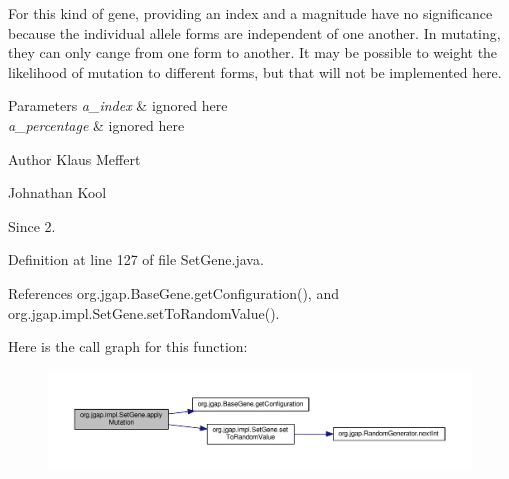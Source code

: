 For this kind of gene, providing an index and a magnitude have no significance because the individual allele forms are independent of one another. In mutating, they can only cange from one form to another. It may be possible to weight the likelihood of mutation to different forms, but that will not be implemented here.


\begin{DoxyParams}{Parameters}
{\em a\-\_\-index} & ignored here \\
\hline
{\em a\-\_\-percentage} & ignored here\\
\hline
\end{DoxyParams}
\begin{DoxyAuthor}{Author}
Klaus Meffert 

Johnathan Kool 
\end{DoxyAuthor}
\begin{DoxySince}{Since}
2. 
\end{DoxySince}


Definition at line 127 of file Set\-Gene.\-java.



References org.\-jgap.\-Base\-Gene.\-get\-Configuration(), and org.\-jgap.\-impl.\-Set\-Gene.\-set\-To\-Random\-Value().



Here is the call graph for this function\-:
\nopagebreak
\begin{figure}[H]
\begin{center}
\leavevmode
\includegraphics[width=350pt]{classorg_1_1jgap_1_1impl_1_1_set_gene_a25f48363b718e483e9b479a51aa9c017_cgraph}
\end{center}
\end{figure}


